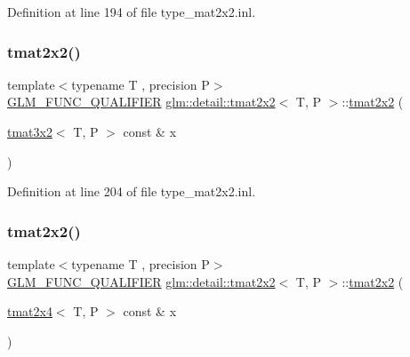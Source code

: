 Definition at line 194 of file type\+\_\+mat2x2.\+inl.

\mbox{\label{structglm_1_1detail_1_1tmat2x2_a4f224e4deddcbcd9f4b3109b595429e6}} 
\subsubsection{\texorpdfstring{tmat2x2()}{tmat2x2()}\hspace{0.1cm}{\footnotesize\ttfamily [14/22]}}
{\footnotesize\ttfamily template$<$typename T , precision P$>$ \\
\hyperlink{setup_8hpp_a33fdea6f91c5f834105f7415e2a64407}{G\+L\+M\+\_\+\+F\+U\+N\+C\+\_\+\+Q\+U\+A\+L\+I\+F\+I\+ER} \hyperlink{structglm_1_1detail_1_1tmat2x2}{glm\+::detail\+::tmat2x2}$<$ T, P $>$\+::\hyperlink{structglm_1_1detail_1_1tmat2x2}{tmat2x2} (\begin{DoxyParamCaption}\item[{\hyperlink{structglm_1_1detail_1_1tmat3x2}{tmat3x2}$<$ T, P $>$ const \&}]{x }\end{DoxyParamCaption})\hspace{0.3cm}{\ttfamily [explicit]}}



Definition at line 204 of file type\+\_\+mat2x2.\+inl.

\mbox{\label{structglm_1_1detail_1_1tmat2x2_ad9aa5899db04b6c8d78d31ebea8ea4c6}} 
\subsubsection{\texorpdfstring{tmat2x2()}{tmat2x2()}\hspace{0.1cm}{\footnotesize\ttfamily [15/22]}}
{\footnotesize\ttfamily template$<$typename T , precision P$>$ \\
\hyperlink{setup_8hpp_a33fdea6f91c5f834105f7415e2a64407}{G\+L\+M\+\_\+\+F\+U\+N\+C\+\_\+\+Q\+U\+A\+L\+I\+F\+I\+ER} \hyperlink{structglm_1_1detail_1_1tmat2x2}{glm\+::detail\+::tmat2x2}$<$ T, P $>$\+::\hyperlink{structglm_1_1detail_1_1tmat2x2}{tmat2x2} (\begin{DoxyParamCaption}\item[{\hyperlink{structglm_1_1detail_1_1tmat2x4}{tmat2x4}$<$ T, P $>$ const \&}]{x }\end{DoxyParamCaption})\hspace{0.3cm}{\ttfamily [explicit]}}




